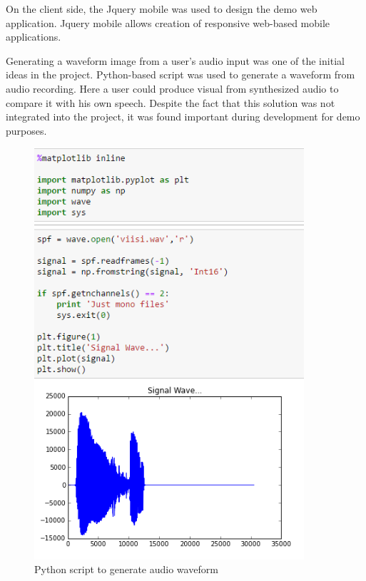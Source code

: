 \documentclass[11pt,a4paper,oneside,article]{memoir}
\begin{document}
On the client side, the Jquery mobile was used to design the demo web application. Jquery mobile allows creation of responsive web-based mobile applications.


Generating a waveform image from a user's audio input was one of the initial ideas in the project. Python-based script was used to generate a waveform from audio recording. Here a user could produce visual from synthesized audio to compare it with his own speech. Despite the fact that this solution was not integrated into the project, it was found important during development for demo purposes.

\begin{figure}[!h]
\includegraphics[width=10cm]{python}
\caption{Python script to generate audio waveform}
\label{fig:python}
\end{figure}
\end{document}
